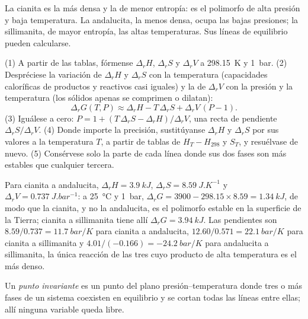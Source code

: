 La cianita es la más densa y la de menor entropía: es el polimorfo de alta presión y
baja temperatura. La andalucita, la menos densa, ocupa las bajas presiones; la sillimanita,
de mayor entropía, las altas temperaturas. Sus líneas de equilibrio pueden calcularse.

\begin{method}\label{met:b2:metamorphic-facies:line}
(1) A partir de las tablas, fórmense $\Delta_r H$, $\Delta_r S$ y $\Delta_r V$ a \qty{298.15}{K}
y \qty{1}{bar}. (2) Despréciese la variación de $\Delta_r H$ y $\Delta_r S$ con la
temperatura (capacidades caloríficas de productos y reactivos casi iguales) y la de $\Delta_r V$
con la presión y la temperatura (los sólidos apenas se comprimen o dilatan):
\[
\Delta_r G(T, P) \approx \Delta_r H - T\,\Delta_r S + \Delta_r V\,(P - 1).
\]
(3) Iguálese a cero: $P = 1 + (T\,\Delta_r S - \Delta_r H)/\Delta_r V$, una recta de
pendiente $\Delta_r S/\Delta_r V$. (4) Donde importe la precisión, sustitúyanse $\Delta_r H$ y
$\Delta_r S$ por sus valores a la temperatura $T$, a partir de tablas de $H_T - H_{298}$ y $S_T$,
y resuélvase de nuevo. (5) Consérvese solo la parte de cada línea donde sus dos fases son más estables
que cualquier tercera.
\end{method}

Para cianita a andalucita, $\Delta_r H = \qty{3.9}{kJ}$, $\Delta_r S =
\qty{8.59}{J.K^{-1}}$ y $\Delta_r V = \qty{0.737}{J.bar^{-1}}$: a \qty{25}{\celsius}
y \qty{1}{bar}, $\Delta_r G = 3900 - 298.15\times8.59 = \qty{+1.34}{kJ}$, de modo que la cianita,
y no la andalucita, es el polimorfo estable en la superficie de la Tierra; cianita a sillimanita tiene allí
$\Delta_r G = \qty{+3.94}{kJ}$. Las pendientes son $8.59/0.737 = \qty{11.7}{bar/K}$ para
cianita a andalucita, $12.60/0.571 = \qty{22.1}{bar/K}$ para cianita a sillimanita y
$4.01/(-0.166) = \qty{-24.2}{bar/K}$ para andalucita a sillimanita, la única reacción de
las tres cuyo producto de alta temperatura es el más denso.

\begin{definition}\label{def:b2:metamorphic-facies:invariant}
Un \emph{punto invariante} es un punto del
plano presión--temperatura donde tres o más fases de un sistema coexisten en
equilibrio y se cortan todas las líneas  entre ellas; allí ninguna variable queda libre.
\end{definition}

